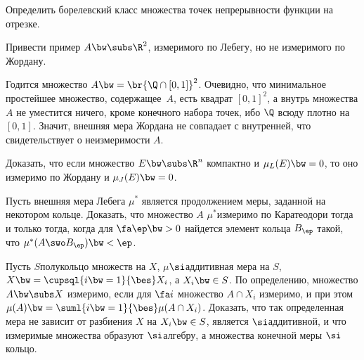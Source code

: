 \documentclass[a4paper]{article}
\begin{document}
\begin{problem}
  Определить борелевский класс множества точек непрерывности функции на отрезке.
\end{problem}

\begin{problem}
  Привести пример $A \bw\subs \R^2$, измеримого по Лебегу, но не измеримого по Жордану.
\end{problem}
\begin{solution}
  Годится множество $A\bw=\br{\Q \cap [0,1]}^2$. Очевидно, что минимальное простейшее множество,
  содержащее~$A$, есть квадрат $[0,1]^2$, а внутрь множества $A$ не уместится ничего, кроме
  конечного набора точек, ибо $\Q$ всюду плотно на $[0,1]$. Значит, внешняя мера Жордана не
  совпадает с внутренней, что свидетельствует о неизмеримости $A$.
\end{solution}

\begin{problem}
  Доказать, что если множество $E \bw\subs \R^n$ компактно и $\mu_L(E)\bw=0$, то оно измеримо по
  Жордану и $\mu_J(E)\bw=0$.
\end{problem}

\begin{problem}
  Пусть внешняя мера Лебега $\mu^*$ является продолжением меры, заданной на некотором кольце.
  Доказать, что множество $A$ $\mu^*$\д измеримо по Каратеодори тогда и только тогда, когда
  для $\fa \ep \bw> 0$ найдется элемент кольца $B_\ep$ такой, что $\mu^*(A \swo B_\ep) \bw< \ep$.
\end{problem}

\begin{problem}
  Пусть $S$\т полукольцо множеств на $X$, $\mu$\т $\si$\д аддитивная мера на $S$,
  $X\bw=\cupsql{i\bw=1}{\bes} X_i$, а $X_i \bw\in S$. По определению, множество $A \bw\subs X$ измеримо, если
  для $\fa i$ множество $A \cap X_i$ измеримо, и при этом $\mu(A) \bw= \suml{i\bw=1}{\bes}\mu(A\cap
  X_i)$. Доказать, что так определенная мера не зависит от разбиения $X$ на $X_i \bw\in S$, является
  $\si$\д аддитивной, и что измеримые множества образуют $\si$\д алгебру, а множества конечной меры\т
  $\si$\д кольцо.
\end{problem}
\end{document}
